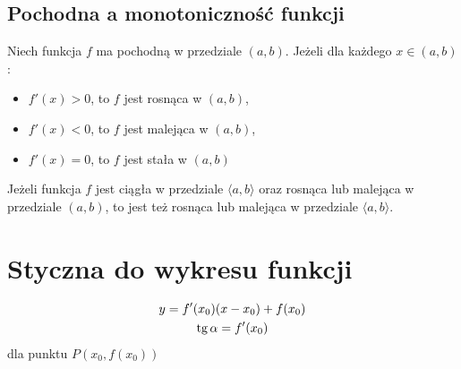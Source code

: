 \subsection{Pochodna a monotoniczność funkcji}
\begin{theorem}
  Niech funkcja $f$ ma pochodną w przedziale $(a, b)$. Jeżeli dla każdego $x \in (a, b)$:
  \begin{itemize}
    \item $f'(x) > 0$, to $f$ jest rosnąca w $(a, b)$,
    \item $f'(x) < 0$, to $f$ jest malejąca w $(a, b)$,
    \item $f'(x) = 0$, to $f$ jest stała w $(a, b)$
  \end{itemize}
\end{theorem}

\begin{theorem}
  Jeżeli funkcja $f$ jest ciągła w przedziale $\langle a, b\rangle$ oraz rosnąca lub malejąca w
  przedziale $(a, b)$, to jest też rosnąca lub malejąca w przedziale $\langle a, b\rangle$.
\end{theorem}

\section{Styczna do wykresu funkcji}
\begin{gather*}
  y = f'(x_0)(x - x_0) + f(x_0)\\
  \operatorname{tg} \alpha = f'(x_0)
\end{gather*}
dla punktu $P(x_0, f(x_0))$

